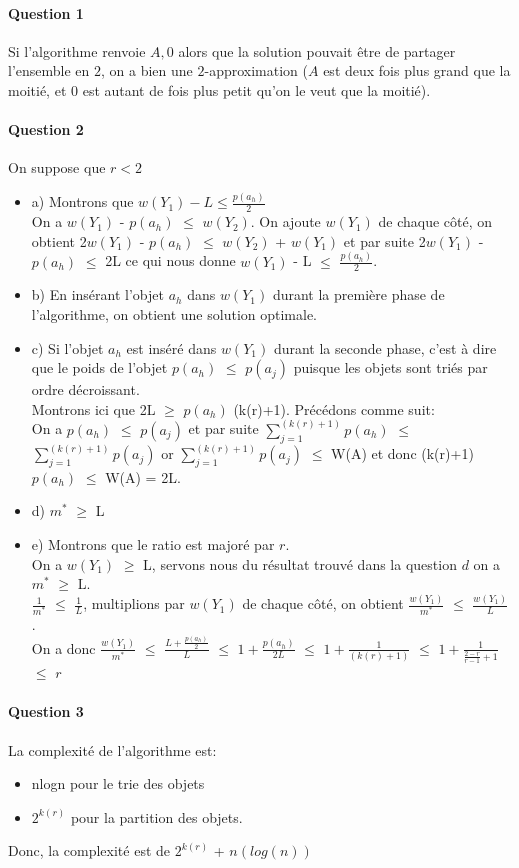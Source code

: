 \paragraph{Question 1}

Si l'algorithme renvoie $A, 0$ alors que la solution pouvait être de
partager l'ensemble en $2$, on a bien une $2$-approximation ($A$ est
deux fois plus grand que la moitié, et $0$ est autant de fois plus
petit qu'on le veut que la moitié).

\paragraph{Question 2}
On suppose que $r < 2$
\begin{itemize}
\item a) Montrons que $w(Y_{1}) - L \leqslant \frac{p(a_{h})}{2}$\\
On a $w(Y_{1})$ - $p(a_{h})$ $\leqslant$ $w(Y_{2})$. On ajoute $w(Y_{1})$ de chaque côté, on obtient 2$w(Y_{1})$ - $p(a_{h})$ $\leqslant$ $w(Y_{2})$ + $w(Y_{1})$ et par suite 2$w(Y_{1})$ - $p(a_{h})$ $\leqslant$ 2L ce qui nous donne $w(Y_{1})$ - L $\leqslant$ $\frac{p(a_{h})}{2}$.
\item b) En insérant l'objet $a_{h}$ dans $w(Y_{1})$ durant la première phase de l'algorithme, on obtient une solution optimale. 
\item c) Si l'objet $a_{h}$ est inséré dans $w(Y_{1})$ durant la seconde phase, c'est à dire que le poids de l'objet  $p(a_{h})$ $\leqslant$ $p(a_{j})$ puisque les objets sont triés par ordre décroissant.\\
Montrons ici que 2L $\geqslant$ $p(a_{h})$ (k(r)+1).
Précédons comme suit:\\
On a $p(a_{h})$ $\leqslant$ $p(a_{j})$ et par suite $\sum_{j=1}^{(k(r)+1)} p(a_{h})$ $\leqslant$ $\sum_{j=1}^{(k(r)+1)} p(a_{j})$ or $\sum_{j=1}^{(k(r)+1)} p(a_{j})$ $\leqslant$ W(A) et donc (k(r)+1)$p(a_{h})$ $\leqslant$ W(A) = 2L. 
\item d) $m^{*}$ $\geqslant$ L
\item e) Montrons que le ratio est majoré par $r$.\\
On a $w(Y_{1})$ $\geqslant$ L, servons nous du résultat trouvé dans la question $d$ on a $m^{*}$ $\geqslant$ L.\\
$\frac{1}{m^{*}}$ $\leqslant$ $\frac{1}{L}$, multiplions par $w(Y_{1})$ de chaque côté, on obtient $\frac{w(Y_{1})}{m^{*}}$ $\leqslant$ $\frac{w(Y_{1})}{L}$.\\
On a donc $\frac{w(Y_{1})}{m^{*}}$ $\leqslant$ $\frac {L + \frac {p(a_{h})}{2}}{L}$ $\leqslant$ $1 + \frac{p(a_{h})}{2L}$ $\leqslant$ $1 + \frac{1}{(k(r)+1)}$ $\leqslant$ $1 + \frac{1}{\frac{2-r}{r-1}+1}$ $\leqslant$ $r$
\end{itemize}
\paragraph{Question 3}
La complexité de l'algorithme est: 
\begin{itemize}
\item nlogn pour le trie des objets 
\item $2^{k(r)}$ pour la partition des objets.
\end{itemize}
Donc, la complexité est de $2^{k(r)}$ +  $n(log(n))$
